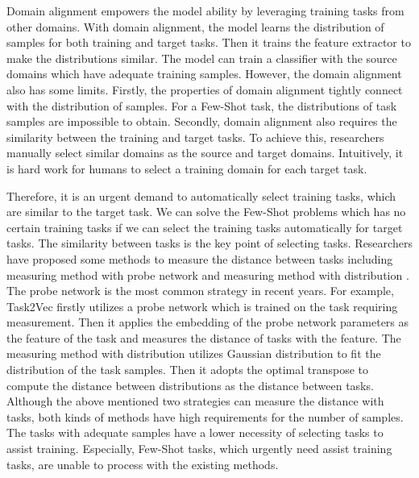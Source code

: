 \documentclass[10pt,journal,compsoc]{IEEEtran}
\begin{document}
Domain alignment \cite{domain_generalization_survey,GOT_DA} empowers the model ability by leveraging training tasks from other domains. With domain alignment, the model learns the distribution of samples for both training and target tasks. Then it trains the feature extractor to make the distributions similar. The model can train a classifier with the source domains which have adequate training samples. However, the domain alignment also has some limits. Firstly, the properties of domain alignment tightly connect with the distribution of samples. For a Few-Shot task, the distributions of task samples are impossible to obtain. Secondly, domain alignment also requires the similarity between the training and target tasks. To achieve this, researchers manually select similar domains as the source and target domains. Intuitively, it is hard work for humans to select a training domain for each target task. 


Therefore, it is an urgent demand to automatically select training tasks, which are similar to the target task. We can solve the Few-Shot problems \cite{few_shot_survey,protonet} which has no certain training tasks if we can select the training tasks automatically for target tasks. The similarity between tasks is the key point of selecting tasks. Researchers have proposed some methods to measure the distance between tasks including measuring method with probe network \cite{task2vec, task2vec_2} and measuring method with distribution \cite{task_distribution_OT}. The probe network is the most common strategy in recent years. For example, Task2Vec \cite{task2vec} firstly utilizes a probe network which is trained on the task requiring measurement. Then it applies the embedding of the probe network parameters as the feature of the task and measures the distance of tasks with the feature. The measuring method with distribution \cite{task_distribution_OT} utilizes Gaussian distribution to fit the distribution of the task samples. Then it adopts the optimal transpose \cite{ot,ot_graph,GOT_DA} to compute the distance between distributions as the distance between tasks. Although the above mentioned two strategies can measure the distance with tasks, both kinds of methods have high requirements for the number of samples. The tasks with adequate samples have a lower necessity of selecting tasks to assist training. Especially, Few-Shot tasks, which urgently need assist training tasks, are unable to process with the existing methods.
\end{document}
